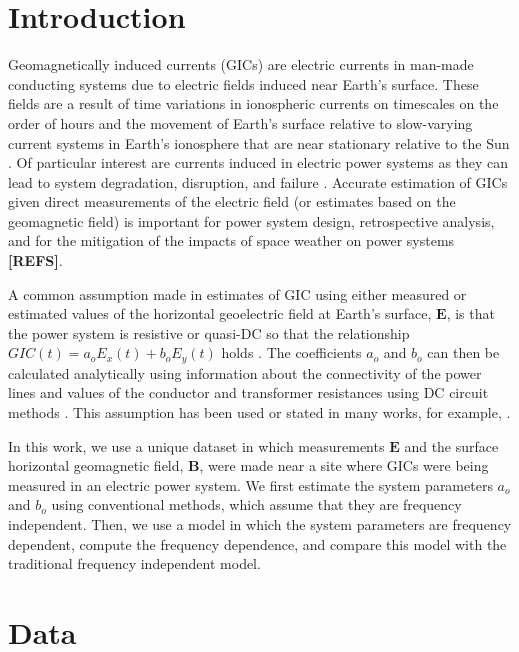 \documentclass[draft,linenumbers]{agujournal2018}
\begin{document}
\section{Introduction}

Geomagnetically induced currents (GICs) are electric currents in man-made conducting systems due to electric fields induced near Earth's surface. These fields are a result of time variations in ionospheric currents on timescales on the order of hours \citep{Ohtani2000} and the movement of Earth's surface relative to slow-varying current systems in Earth's ionosphere that are near stationary relative to the Sun \citep{Stening2013}. Of particular interest are currents induced in electric power systems as they can lead to system degradation, disruption, and failure \citep{Albertson1993,NERC2012}. Accurate estimation of GICs given direct measurements of the electric field (or estimates based on the geomagnetic field) is important for power system design, retrospective analysis, and for the mitigation of the impacts of space weather on power systems  {\color{red} \textbf{[REFS]}}.

A common assumption made in estimates of GIC using either measured or estimated values of the horizontal geoelectric field at Earth's surface, $\mathbf{E}$, is that the power system is resistive or quasi-DC so that the relationship $GIC(t) = a_oE_x(t) + b_oE_y(t)$ holds \citep{Albertson1981,Lehtinen1985}.  The coefficients $a_o$ and $b_o$ can then be calculated analytically using information about the connectivity of the power lines and values of the conductor and transformer resistances using DC circuit methods \citep[e.g.][]{Boteler2014a,Boteler2014b}. This assumption has been used or stated in many works, for example, \citet{Pulkkinen2007,Wik2008,Pulkkinen2010,Ngwira2011,Viljanen2012,Overbye2012}.

In this work, we use a unique dataset in which measurements $\mathbf{E}$ and the surface horizontal geomagnetic field, $\mathbf{B}$, were made near a site where GICs were being measured in an electric power system.  We first estimate the system parameters $a_o$ and $b_o$ using conventional methods, which assume that they are frequency independent.  Then, we use a model in which the system parameters are frequency dependent, compute the frequency dependence, and compare this model with the traditional frequency independent model. 

\section{Data}
\end{document}
